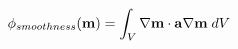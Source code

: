 \vspace{-0.1cm}
\begin{equation}
    \phi_{smoothness}(\mathbf{m}) = \int_{V} \nabla \mathbf{m} \cdot \mathbf{a} \nabla \mathbf{m} \;dV
    \label{eq:forward-pass}
    \vspace{-0.05cm}
\end{equation}